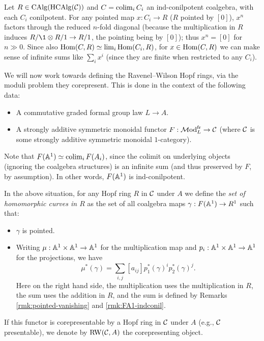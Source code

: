 \begin{remark} \label{rmk:pointed-vanishing}
Let $R \in \mathrm{CAlg}(\mathrm{HCAlg}(\mathcal C))$ and $C = \operatorname*{colim}_i C_i$ an ind-conilpotent coalgebra, with each $C_i$ conilpotent.
For any pointed map $x: C_i \to R$ ($R$ pointed by $[0]$), $x^n$ factors through the reduced $n$-fold diagonal (because the multiplication in $R$ induces $R/\1 \otimes R/1 \to R/1$, the pointing being by $[0]$); thus $x^n = [0]$ for $n \gg 0$.
Since also $\operatorname{Hom}(C, R) \simeq \operatorname*{lim}_i \operatorname{Hom}(C_i, R)$, for $x \in \operatorname{Hom}(C, R)$ we can make sense of infinite sums like $\sum_i x^i$ (since they are finite when restricted to any $C_i$).
\end{remark}

We will now work towards defining the Ravenel--Wilson Hopf rings, via the moduli problem they corepresent.
This is done in the context of the following data:
\begin{itemize}
\item A commutative graded formal group law $L \to A$.
\item A strongly additive symmetric monoidal functor $F: \mathcal{M}\mathrm{od}_L^{\mathrm{fr}} \to \mathcal C$ (where $\mathcal C$ is some strongly additive symmetric monoidal $1$-category).
\end{itemize}
\begin{remark} \label{rmk:FA1-indconil}
Note that $F(\mathbb A^1) \simeq \operatorname*{colim}_i F(A_i)$, since the colimit on underlying objects (ignoring the coalgebra structures) is an infinite sum (and thus preserved by $F$, by assumption).
In other words, $F(\mathbb A^1)$ is ind-conilpotent.
\end{remark}
\begin{definition} \label{def:homomorphic-curve}
In the above situation, for any Hopf ring $R$ in $\mathcal C$ under $A$ we define the \emph{set of homomorphic curves in $R$} as the set of all coalgebra maps $\gamma: F(\mathbb A^1) \to R^1$ such that:
\begin{itemize}
\item $\gamma$ is pointed.
\item Writing $\mu: \mathbb A^1 \times \mathbb A^1 \to \mathbb A^1$ for the multiplication map and $p_i: \mathbb A^1 \times \mathbb A^1 \to \mathbb A^1$ for the projections, we have \[ \mu^*(\gamma) = \sum_{i,j} [a_{ij}] p_1^*(\gamma)^i p_2^*(\gamma)^j. \]
  Here on the right hand side, the multiplication uses the multiplication in $R$, the sum uses the addition in $R$, and the sum is defined by Remarks \ref{rmk:pointed-vanishing} and \ref{rmk:FA1-indconil}.
\end{itemize}

If this functor is corepresentable by a Hopf ring in $\mathcal C$ under $A$ (e.g., $\mathcal C$ presentable), we denote by $\mathrm{RW}(\mathcal C, A)$ the corepresenting object.
\end{definition}
